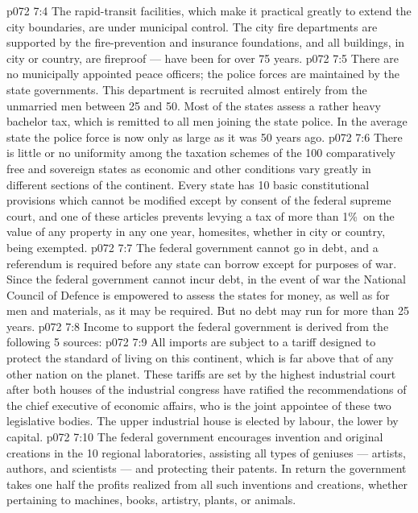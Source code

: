 \vs p072 7:4 The rapid\hyp{}transit facilities, which make it practical greatly to extend the city boundaries, are under municipal control. The city fire departments are supported by the fire\hyp{}prevention and insurance foundations, and all buildings, in city or country, are fireproof --- have been for over 75 years.
\vs p072 7:5 There are no municipally appointed peace officers; the police forces are maintained by the state governments. This department is recruited almost entirely from the unmarried men between 25 and 50. Most of the states assess a rather heavy bachelor tax, which is remitted to all men joining the state police. In the average state the police force is now only  as large as it was 50 years ago.
\vs p072 7:6 \pc There is little or no uniformity among the taxation schemes of the 100 comparatively free and sovereign states as economic and other conditions vary greatly in different sections of the continent. Every state has 10 basic constitutional provisions which cannot be modified except by consent of the federal supreme court, and one of these articles prevents levying a tax of more than 1\%\ on the value of any property in any one year, homesites, whether in city or country, being exempted.
\vs p072 7:7 The federal government cannot go in debt, and a  referendum is required before any state can borrow except for purposes of war. Since the federal government cannot incur debt, in the event of war the National Council of Defence is empowered to assess the states for money, as well as for men and materials, as it may be required. But no debt may run for more than 25 years.
\vs p072 7:8 \pc Income to support the federal government is derived from the following 5 sources:
\vs p072 7:9 \bibnobreakspace {} All imports are subject to a tariff designed to protect the standard of living on this continent, which is far above that of any other nation on the planet. These tariffs are set by the highest industrial court after both houses of the industrial congress have ratified the recommendations of the chief executive of economic affairs, who is the joint appointee of these two legislative bodies. The upper industrial house is elected by labour, the lower by capital.
\vs p072 7:10 \bibnobreakspace {} The federal government encourages invention and original creations in the 10 regional laboratories, assisting all types of geniuses --- artists, authors, and scientists --- and protecting their patents. In return the government takes one half the profits realized from all such inventions and creations, whether pertaining to machines, books, artistry, plants, or animals.
